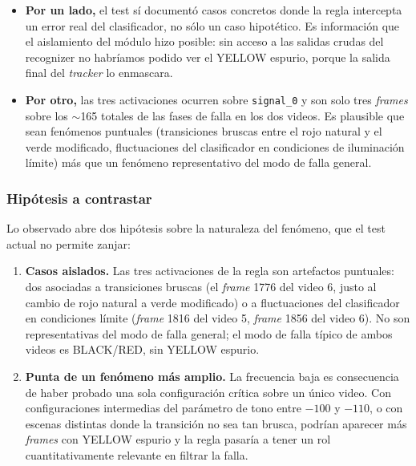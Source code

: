 \begin{itemize}
    \item \textbf{Por un lado,} el test sí documentó casos concretos donde la regla intercepta un error real del clasificador, no sólo un caso hipotético. Es información que el aislamiento del módulo hizo posible: sin acceso a las salidas crudas del recognizer no habríamos podido ver el YELLOW espurio, porque la salida final del \textit{tracker} lo enmascara.

    \item \textbf{Por otro,} las tres activaciones ocurren sobre \texttt{signal\_0} y son solo tres \textit{frames} sobre los $\sim$165 totales de las fases de falla en los dos videos. Es plausible que sean fenómenos puntuales (transiciones bruscas entre el rojo natural y el verde modificado, fluctuaciones del clasificador en condiciones de iluminación límite) más que un fenómeno representativo del modo de falla general.
\end{itemize}

\subsubsection{Hipótesis a contrastar}

Lo observado abre dos hipótesis sobre la naturaleza del fenómeno, que el test actual no permite zanjar:

\begin{enumerate}
    \item \textbf{Casos aislados.} Las tres activaciones de la regla son artefactos puntuales: dos asociadas a transiciones bruscas (el \textit{frame} 1776 del video 6, justo al cambio de rojo natural a verde modificado) o a fluctuaciones del clasificador en condiciones límite (\textit{frame} 1816 del video 5, \textit{frame} 1856 del video 6). No son representativas del modo de falla general; el modo de falla típico de ambos videos es BLACK/RED, sin YELLOW espurio.

    \item \textbf{Punta de un fenómeno más amplio.} La frecuencia baja es consecuencia de haber probado una sola configuración crítica sobre un único video. Con configuraciones intermedias del parámetro de tono entre $-100$ y $-110$, o con escenas distintas donde la transición no sea tan brusca, podrían aparecer más \textit{frames} con YELLOW espurio y la regla pasaría a tener un rol cuantitativamente relevante en filtrar la falla.
\end{enumerate}

